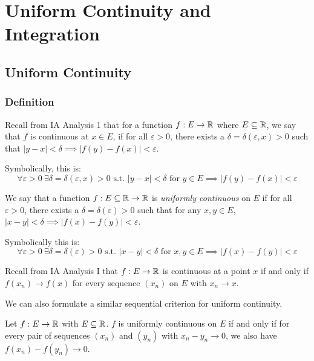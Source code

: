 \documentclass[../main.tex]{subfiles}
\begin{document}
\chapter{Uniform Continuity and Integration}
\section{Uniform Continuity}
\subsection{Definition}
\begin{remark}[Recap]
  Recall from IA Analysis 1 that for a function $f: E \to \mathbb{R}$ where $E \subseteq \mathbb{R}$, we say that $f$ is continuous at $x \in E$, if for all $\varepsilon > 0$, there exists a $\delta = \delta(\varepsilon, x) > 0$ such that $|y - x| < \delta \implies |f(y) - f(x)| < \varepsilon$.

  Symbolically, this is:
  \[
    \forall \varepsilon > 0\ \exists \delta = \delta(\varepsilon, x) > 0 \text{ s.t. } |y - x| < \delta \text{ for } y \in E \implies |f(y) - f(x)| < \varepsilon
  \]
\end{remark}
\begin{definition}
  We say that a function $f: E \subseteq \mathbb{R} \to \mathbb{R}$ is \textit{uniformly continuous} on $E$ if for all $\varepsilon > 0$, there exists a $\delta = \delta(\varepsilon) > 0$ such that for any $x, y \in E$, $|x - y| < \delta \implies |f(x) - f(y)| < \varepsilon$.

  Symbolically this is:
  \[
    \forall \varepsilon > 0\ \exists \delta = \delta(\varepsilon) > 0 \text{ s.t. } |x - y| < \delta \text{ for } x, y \in E \implies |f(x) - f(y)| < \varepsilon
  \]
\end{definition}
\begin{remark}[Recap]
  Recall from IA Analysis I that $f: E \to \mathbb{R}$ is continuous at a point $x$ if and only if $f(x_n) \to f(x)$ for every sequence $(x_n)$ on $E$ with $x_n \to x$.
\end{remark}
We can also formulate a similar sequential criterion for uniform continuity.
\begin{proposition}
  Let $f: E \to \mathbb{R}$ with $E \subseteq \mathbb{R}$.
  $f$ is uniformly continuous on $E$ if and only if for every pair of sequences $(x_n)$ and $(y_n)$ with $x_n - y_n \to 0$, we also have $f(x_n) - f(y_n) \to 0$. \label{seqUnif}
\end{proposition}
\end{document}
